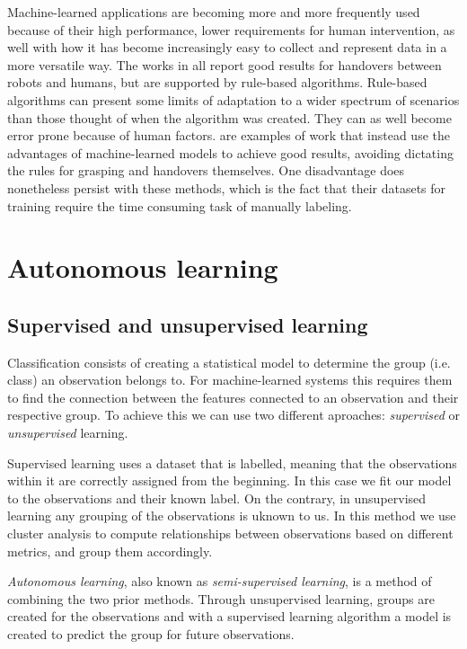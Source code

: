 Machine-learned applications are becoming more and more frequently used because of their high performance, lower requirements for human intervention, as well with how it has become increasingly easy to collect and represent data in a more versatile way. The works in \parencite{Aleotti2012} \parencite{Suay2015} \parencite{Kim2004} all report good results for handovers between robots and humans, but are supported by rule-based algorithms. Rule-based algorithms can present some limits of adaptation to a wider spectrum of scenarios than those thought of when the algorithm was created. They can as well become error prone because of human factors. \parencite{Redmon2014} \parencite{Lenz2015} \parencite{Jiang2011} \parencite{Huebner2008a} are examples of work that instead use the advantages of machine-learned models to achieve good results, avoiding dictating the rules for grasping and handovers themselves. One disadvantage does nonetheless persist with these methods, which is the fact that their datasets for training require the time consuming task of manually labeling.


\section{Autonomous learning}


\subsection{Supervised and unsupervised learning}

Classification consists of creating a statistical model to determine the group (i.e. class) an observation belongs to. For machine-learned systems this requires them to find the connection between the features connected to an observation and their respective group. To achieve this we can use two different aproaches: \emph{supervised} or \emph{unsupervised} learning.

Supervised learning uses a dataset that is labelled, meaning that the observations within it are correctly assigned from the beginning. In this case we fit our model to the observations and their known label. On the contrary, in unsupervised learning any grouping of the observations is uknown to us. In this method we use cluster analysis to compute relationships between observations based on different metrics, and group them accordingly.

\emph{Autonomous learning}, also known as \emph{semi-supervised learning}, is a method of combining the two prior methods. Through unsupervised learning, groups are created for the observations and with a supervised learning algorithm a model is created to predict the group for future observations.


